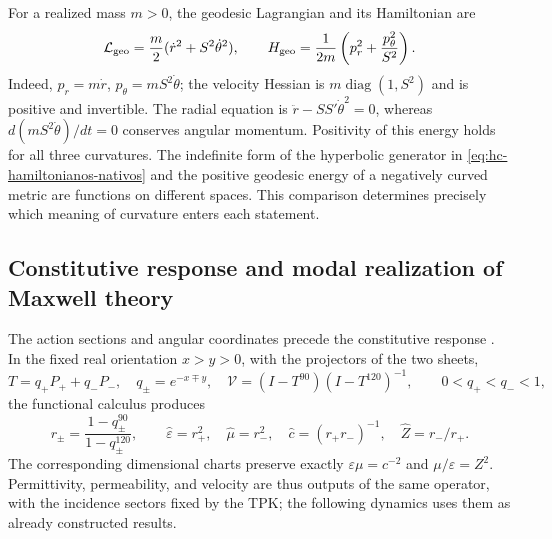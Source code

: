 For a realized mass \(m>0\), the geodesic Lagrangian and its
Hamiltonian are
\begin{equation}
 \mathcal L_{\rm geo}=\frac m2(\dot r^2+S^2\dot\theta^2),\qquad
 H_{\rm geo}=\frac1{2m}\left(p_r^2+\frac{p_\theta^2}{S^2}\right).
 \label{eq:hc-geodesique}
\end{equation}
Indeed, \(p_r=m\dot r\), \(p_\theta=mS^2\dot\theta\);
the velocity Hessian is \(m\operatorname{diag}(1,S^2)\)
and is positive and invertible. The radial equation is
\(\ddot r-SS'\dot\theta^2=0\), whereas
\(d(mS^2\dot\theta)/dt=0\) conserves angular momentum.
Positivity of this energy holds for all three curvatures. The indefinite
form of the hyperbolic generator in \eqref{eq:hc-hamiltonianos-nativos}
and the positive geodesic energy of a negatively curved metric
are functions on different spaces. This comparison determines precisely
which meaning of curvature enters each statement.

\subsection{Constitutive response and modal realization of Maxwell theory}

The action sections and angular coordinates precede the
constitutive response \cite{hmtIntegral}. In the fixed real orientation \(x>y>0\),
with the projectors of the two sheets,
\[
 T=q_+P_++q_-P_-,\quad q_\pm=e^{-x\mp y},\quad
 \mathcal V=(I-T^{90})(I-T^{120})^{-1},
 \qquad 0<q_+<q_-<1,
\]
the functional calculus produces
\[
 r_\pm=\frac{1-q_\pm^{90}}{1-q_\pm^{120}},\qquad
 \widehat\varepsilon=r_+^2,\quad \widehat\mu=r_-^2,
 \quad \widehat c=(r_+r_-)^{-1},\quad \widehat Z=r_-/r_+.
\]
The corresponding dimensional charts preserve exactly
\(\varepsilon\mu=c^{-2}\) and \(\mu/\varepsilon=Z^2\).
Permittivity, permeability, and velocity are thus outputs
of the same operator, with the incidence sectors fixed by the TPK;
the following dynamics uses them as already constructed results.

